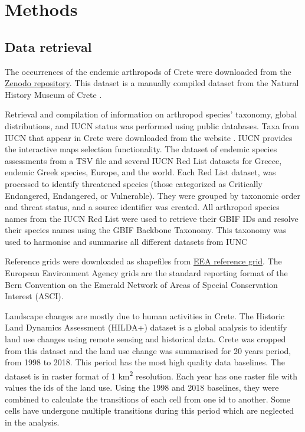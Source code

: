 \section{Methods}
\label{sec:arthropods-method}
   
    \subsection{Data retrieval}
    \label{subsec:arthropods-land-use}

The occurrences of the endemic arthropods of Crete were downloaded from the
\href{https://zenodo.org/records/10635645}{Zenodo repository}. This dataset
is a manually compiled dataset from the Natural History Museum of Crete \parencite{bolanakis2024}.

Retrieval and compilation of information on arthropod species' taxonomy,
global distributions, and IUCN status was performed using public databases.
Taxa from IUCN that appear in Crete were downloaded from the website \parencite{iucn2024}. IUCN provides the 
interactive maps selection functionality. 
The dataset of endemic species assessments from a TSV file and several IUCN Red
List datasets for Greece, endemic Greek species, Europe, and the world.
Each Red List dataset, was processed to identify threatened species
(those categorized as Critically Endangered, Endangered, or Vulnerable).
They were grouped by taxonomic order and threat status, and a source identifier was created.
All arthropod species names from the IUCN Red List were used to retrieve their GBIF IDs
and resolve their species names using the GBIF Backbone Taxonomy.
This taxonomy was used to harmonise and summarise all different datasets from IUNC

Reference grids were downloaded as shapefiles from \href{https://www.eea.europa.eu/en/datahub/datahubitem-view/3c362237-daa4-45e2-8c16-aaadfb1a003b}{EEA reference grid}.
The European Environment Agency grids are the standard reporting format of the Bern Convention
on the Emerald Network of Areas of Special Conservation Interest (ASCI).

Landscape changes are mostly due to human activities in Crete.
The Historic Land Dynamics Assessment (HILDA+) dataset \parencite{winkler2021global}
is a global analysis to identify land use changes using remote sensing and 
historical data. Crete was cropped from this dataset and the land use change was 
summarised for 20 years period, from 1998 to 2018. This period has the most 
high quality data baselines. The dataset is in raster format of 1 km\textsuperscript{2}
resolution. Each year has one raster file with values the ids of the land use. 
Using the 1998 and 2018 baselines, they were combined to calculate the 
transitions of each cell from one id to another. Some cells have undergone 
multiple transitions during this period which are neglected in the analysis.

